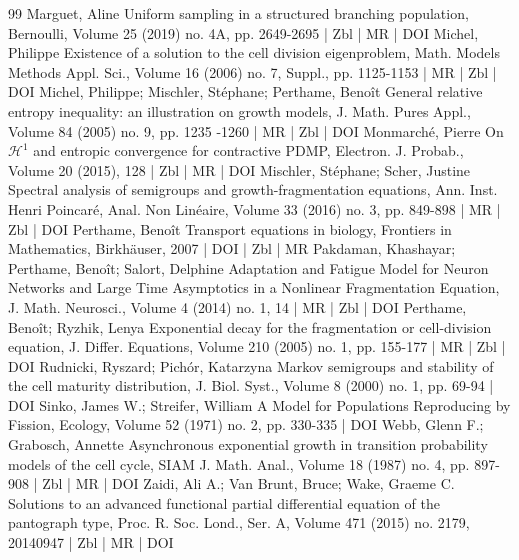 \documentclass[10pt]{amsart}
\theoremstyle{definition}\newtheorem{defi}[theo]{Definition}\newtheorem{rema}[theo]{Remark}\newtheorem{exam}[theo]{Example}\newtheorem{exem}[theo]{Example}\newtheorem{nota}[theo]{Notation}
\newcommand{\1}{\mathds{1}}
\begin{document}
\begin{thebibliography}{99}
Marguet, Aline Uniform sampling in a structured branching population, Bernoulli, Volume 25 (2019) no. 4A, pp. 2649-2695 | Zbl | MR | DOI
Michel, Philippe Existence of a solution to the cell division eigenproblem, Math. Models Methods Appl. Sci., Volume 16 (2006) no. 7, Suppl., pp. 1125-1153 | MR | Zbl | DOI
Michel, Philippe; Mischler, Stéphane; Perthame, Benoît General relative entropy inequality: an illustration on growth models, J. Math. Pures Appl., Volume 84 (2005) no. 9, pp. 1235 -1260 | MR | Zbl | DOI
Monmarché, Pierre On $\mathcal{H}^1$ and entropic convergence for contractive PDMP, Electron. J. Probab., Volume 20 (2015), 128 | Zbl | MR | DOI
Mischler, Stéphane; Scher, Justine Spectral analysis of semigroups and growth-fragmentation equations, Ann. Inst. Henri Poincaré, Anal. Non Linéaire, Volume 33 (2016) no. 3, pp. 849-898 | MR | Zbl | DOI
Perthame, Benoît Transport equations in biology, Frontiers in Mathematics, Birkhäuser, 2007 | DOI | Zbl | MR
Pakdaman, Khashayar; Perthame, Benoît; Salort, Delphine Adaptation and Fatigue Model for Neuron Networks and Large Time Asymptotics in a Nonlinear Fragmentation Equation, J. Math. Neurosci., Volume 4 (2014) no. 1, 14 | MR | Zbl | DOI
Perthame, Benoît; Ryzhik, Lenya Exponential decay for the fragmentation or cell-division equation, J. Differ. Equations, Volume 210 (2005) no. 1, pp. 155-177 | MR | Zbl | DOI
Rudnicki, Ryszard; Pichór, Katarzyna Markov semigroups and stability of the cell maturity distribution, J. Biol. Syst., Volume 8 (2000) no. 1, pp. 69-94 | DOI
Sinko, James W.; Streifer, William A Model for Populations Reproducing by Fission, Ecology, Volume 52 (1971) no. 2, pp. 330-335 | DOI
Webb, Glenn F.; Grabosch, Annette Asynchronous exponential growth in transition probability models of the cell cycle, SIAM J. Math. Anal., Volume 18 (1987) no. 4, pp. 897-908 | Zbl | MR | DOI
Zaidi, Ali A.; Van Brunt, Bruce; Wake, Graeme C. Solutions to an advanced functional partial differential equation of the pantograph type, Proc. R. Soc. Lond., Ser. A, Volume 471 (2015) no. 2179, 20140947 | Zbl | MR | DOI
\end{thebibliography}
\end{document}
